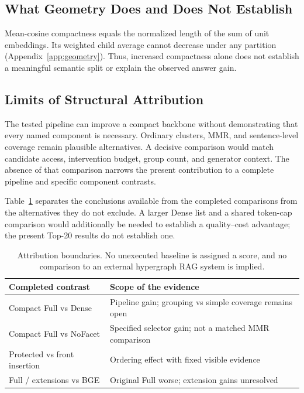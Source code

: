 \documentclass[11pt]{article}
\begin{document}
\subsection{What Geometry Does and Does Not Establish}
Mean-cosine compactness equals the normalized length of the sum of unit
embeddings. Its weighted child average cannot decrease under any partition
(Appendix~\ref{app:geometry}). Thus, increased compactness alone does not
establish a meaningful semantic split or explain the observed answer gain.

\subsection{Limits of Structural Attribution}
The tested pipeline can improve a compact backbone without demonstrating that
every named component is necessary. Ordinary clusters, MMR, and sentence-level
coverage remain plausible alternatives. A decisive comparison would match
candidate access, intervention budget, group count, and generator context.
The absence of that comparison narrows the present contribution to a complete
pipeline and specific component contrasts.

Table~\ref{tab:attribution} separates the conclusions available from the
completed comparisons from the alternatives they do not exclude. A larger
Dense list and a shared token-cap comparison would additionally be needed
to establish a quality--cost advantage; the present Top-20 results do not
establish one.

\begin{table}[t]
\centering\small
\begin{tabular}{@{}p{}p{}@{}}
\toprule
Completed contrast & Scope of the evidence\\
\midrule
Compact Full vs Dense & Pipeline gain; grouping vs simple coverage remains open\\
Compact Full vs NoFacet & Specified selector gain; not a matched MMR comparison\\
Protected vs front insertion & Ordering effect with fixed visible evidence\\
Full / extensions vs BGE & Original Full worse; extension gains unresolved\\
\bottomrule
\end{tabular}
\caption{Attribution boundaries. No unexecuted baseline is assigned a score,
and no comparison to an external hypergraph RAG system is implied.}
\label{tab:attribution}
\end{table}
\end{document}

